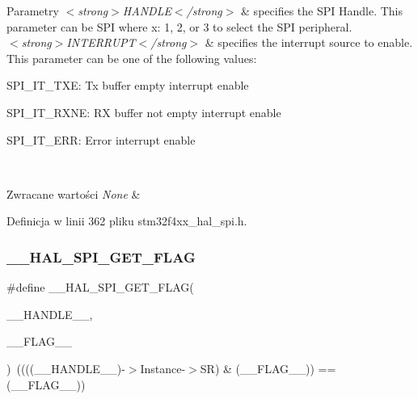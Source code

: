 \begin{DoxyParams}{Parametry}
{\em $<$strong$>$\+H\+A\+N\+D\+L\+E$<$/strong$>$} & specifies the S\+PI Handle. This parameter can be S\+PI where x\+: 1, 2, or 3 to select the S\+PI peripheral. \\
\hline
{\em $<$strong$>$\+I\+N\+T\+E\+R\+R\+U\+P\+T$<$/strong$>$} & specifies the interrupt source to enable. This parameter can be one of the following values\+: \begin{DoxyItemize}
\item S\+P\+I\+\_\+\+I\+T\+\_\+\+T\+XE\+: Tx buffer empty interrupt enable \item S\+P\+I\+\_\+\+I\+T\+\_\+\+R\+X\+NE\+: RX buffer not empty interrupt enable \item S\+P\+I\+\_\+\+I\+T\+\_\+\+E\+RR\+: Error interrupt enable \end{DoxyItemize}
\\
\hline
\end{DoxyParams}

\begin{DoxyRetVals}{Zwracane wartości}
{\em None} & \\
\hline
\end{DoxyRetVals}


Definicja w linii 362 pliku stm32f4xx\+\_\+hal\+\_\+spi.\+h.

\mbox{\label{group___s_p_i___exported___macros_gaa0bbe5fb55f93fd277ddb6acf58cec53}} 
\subsubsection{\texorpdfstring{\+\_\+\+\_\+\+H\+A\+L\+\_\+\+S\+P\+I\+\_\+\+G\+E\+T\+\_\+\+F\+L\+AG}{\_\_HAL\_SPI\_GET\_FLAG}}
{\footnotesize\ttfamily \#define \+\_\+\+\_\+\+H\+A\+L\+\_\+\+S\+P\+I\+\_\+\+G\+E\+T\+\_\+\+F\+L\+AG(\begin{DoxyParamCaption}\item[{}]{\+\_\+\+\_\+\+H\+A\+N\+D\+L\+E\+\_\+\+\_\+,  }\item[{}]{\+\_\+\+\_\+\+F\+L\+A\+G\+\_\+\+\_\+ }\end{DoxyParamCaption})~((((\+\_\+\+\_\+\+H\+A\+N\+D\+L\+E\+\_\+\+\_\+)-\/$>$Instance-\/$>$SR) \& (\+\_\+\+\_\+\+F\+L\+A\+G\+\_\+\+\_\+)) == (\+\_\+\+\_\+\+F\+L\+A\+G\+\_\+\+\_\+))}



